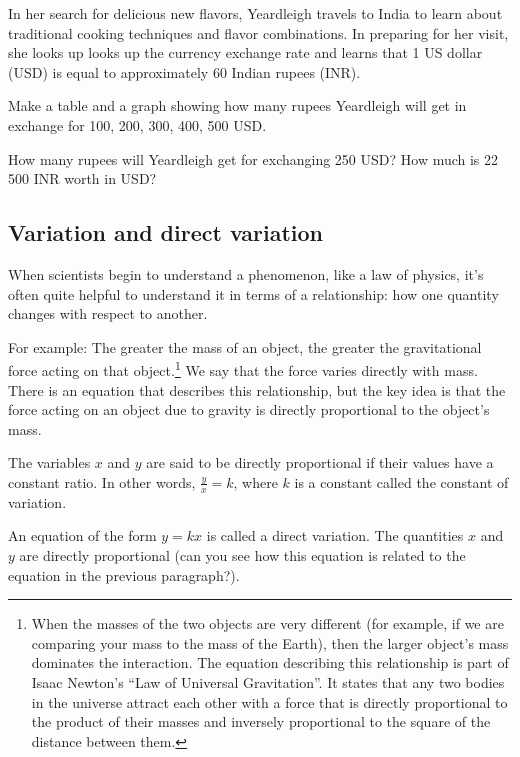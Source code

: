 \begin{boxedexplore}
In her search for delicious new flavors, Yeardleigh travels to India to learn about traditional cooking techniques and flavor combinations. In preparing for her visit, she looks up looks up the currency exchange rate and learns that 1 US dollar (USD) is equal to approximately 60 Indian rupees (INR).

Make a table and a graph showing how many rupees Yeardleigh will get in exchange for 100, 200, 300, 400, 500 USD.

How many rupees will Yeardleigh get for exchanging 250 USD? How much is 22\,500 INR worth in USD?
\end{boxedexplore} %

\subsection{Variation and direct variation}

When scientists begin to understand a phenomenon, like a law of physics, it's often quite helpful to understand it in terms of a relationship: how one quantity changes with respect to another.

For example: The greater the mass of an object, the greater the gravitational force acting on that object.\footnote{When the masses of the two objects are very different (for example, if we are comparing your mass to the mass of the Earth), then the larger object's mass dominates the interaction. The equation describing this relationship is part of Isaac Newton's ``Law of Universal Gravitation''. It states that any two bodies in the universe attract each other with a force that is directly proportional to the product of their masses and inversely proportional to the square of the distance between them.} We say that the force varies directly with mass. There is an equation that describes this relationship, but the key idea is that the force acting on an object due to gravity is directly proportional to the object's mass.

\begin{boxeddef}
The variables $x$ and $y$ are said to be \gls{directly proportional} if their values have a constant ratio. In other words, $\frac{y}{x} = k$, where $k$ is a constant called the \gls{constant of variation}.

An equation of the form $y = kx$ is called a \gls{direct variation}. The quantities $x$ and $y$ are directly proportional (can you see how this equation is related to the equation in the previous paragraph?).
\end{boxeddef}

